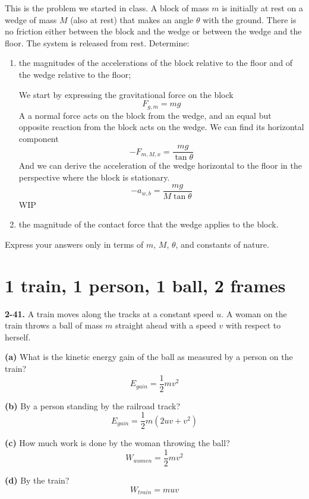 \documentclass[12pt]{article}
\newcommand{\paren}[1]{\left( #1 \right)}
\begin{document}
This is the problem we started in class. A block of mass $m$ is initially at rest on a wedge of mass $M$ (also at rest) that makes an angle $\theta$ with the ground. There is no friction either between the block and the wedge or between the wedge and the floor. The system is released from rest. Determine:
\begin{enumerate}
    \item the magnitudes of the accelerations of the block relative to the floor and of the wedge relative to the floor;

    We start by expressing the gravitational force on the block
    \[
    F_{g,m} = mg
    \]
    A a normal force acts on the block from the wedge, and an equal but opposite reaction from the block acts on the wedge. We can find its horizontal component
    \[
   - F_{m,M,x} = \frac{mg}{\tan\theta}
    \]
    And we can derive the acceleration of the wedge horizontal to the floor in the perspective where the block is stationary. 
    \[
   - a_{w,b} = \frac{mg}{M\tan\theta}
    \]
    WIP
        
    \item the magnitude of the contact force that the wedge applies to the block.
        
\end{enumerate}
Express your answers only in terms of $m$, $M$, $\theta$, and constants of nature.




\section{1 train, 1 person, 1 ball, 2 frames}

\textbf{2-41.} A train moves along the tracks at a constant speed \(u\). A woman on the train throws a ball of mass \(m\) straight ahead with a speed \(v\) with respect to herself.

\textbf{(a)} What is the kinetic energy gain of the ball as measured by a person on the train?
\[
E_{gain} = \frac{1}{2}mv^2
\]

\textbf{(b)} By a person standing by the railroad track?
\[
E_{gain} = \frac{1}{2}m\paren{2uv + v^2}
\]

\textbf{(c)} How much work is done by the woman throwing the ball?
\[
W_{women} = \frac{1}{2}mv^2
\]

\textbf{(d)} By the train?
\[
W_{train} = muv
\]
\end{document}
